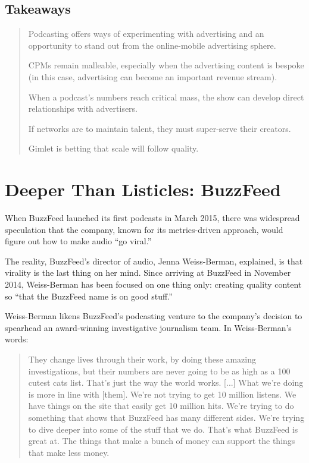 \documentclass[notoc, symmetric, nobib, nols]{towcenter-guideto-book}
\begin{document}
\subsection{Takeaways}

\begin{quote}
\item Podcasting offers ways of experimenting with advertising and an opportunity to stand out from the online-mobile advertising sphere.
\item CPMs remain malleable, especially when the advertising content is bespoke (in this case, advertising can become an important revenue stream).
\item When a podcast's numbers reach critical mass, the show can develop direct relationships with advertisers.
\item If networks are to maintain talent, they must super-serve their creators.
\item Gimlet is betting that scale will follow quality.
\end{quote}

\section{Deeper Than Listicles: BuzzFeed}
       
When BuzzFeed launched its first podcasts in March 2015, there was widespread speculation that the company, known for its metrics-driven approach, would figure out how to make audio ``go viral.''

The reality, BuzzFeed's director of audio, Jenna Weiss-Berman, explained, is that virality is the last thing on her mind. Since arriving at BuzzFeed in November 2014, Weiss-Berman has been focused on one thing only: creating quality content so ``that the BuzzFeed name is on good stuff.''\autocite{wb}

Weiss-Berman likens BuzzFeed's podcasting venture to the company's decision to spearhead an award-winning investigative journalism team. In Weiss-Berman's words: 

\begin{quote}
They change lives through their work, by doing these amazing investigations, but their numbers are never going to be as high as a 100 cutest cats list. That's just the way the world works. [...] What we're doing is more in line with [them]. We're not trying to get 10 million listens. We have things on the site that easily get 10 million hits. We're trying to do something that shows that BuzzFeed has many different sides. We're trying to dive deeper into some of the stuff that we do. That's what BuzzFeed is great at. The things that make a bunch of money can support the things that make less money.\autocite{wb}
\end{quote}
\end{document}

